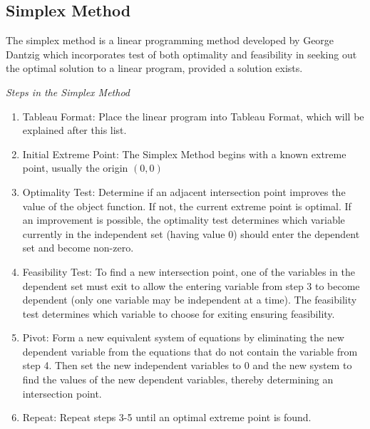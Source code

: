 



\subsection{Simplex Method}
The simplex method is a linear programming method developed by George Dantzig which incorporates test of both optimality and feasibility in seeking out the optimal solution to a linear program, provided a solution exists.\newline


\emph{Steps in the Simplex Method}
\begin{enumerate}
\item Tableau Format: Place the linear program into Tableau Format, which will be explained after this list.
\item Initial Extreme Point: The Simplex Method begins with a known extreme point, usually the origin $(0,0)$
\item Optimality Test: Determine if an adjacent intersection point improves the value of the object function. If not, the current extreme point is optimal. If an improvement is possible, the optimality test determines which variable currently in the independent set (having value 0) should enter the dependent set and become non-zero.
\item Feasibility Test: To find a new intersection point, one of the variables in the dependent set must exit to allow the entering variable from step 3 to become dependent (only one variable may be independent at a time). The feasibility test determines which variable to choose for exiting ensuring feasibility.
\item Pivot: Form a new equivalent system of equations by eliminating the new dependent variable from the equations that do not contain the variable from step 4. Then set the new independent variables to 0 and the new system to find the values of the new dependent variables, thereby determining an intersection point.
\item Repeat: Repeat steps 3-5 until an optimal extreme point is found.
\end{enumerate}

